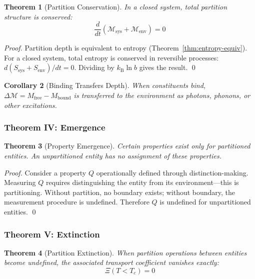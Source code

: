 \documentclass[twocolumn,10pt,a4paper]{article}
\newtheorem{theorem}{Theorem}[section]
\newtheorem{corollary}[theorem]{Corollary}
\theoremstyle{definition}
\theoremstyle{remark}
\newcommand{\kB}{k_{\mathrm{B}}}
\newcommand{\Depth}{\mathcal{M}}
\newcommand{\Mfree}{M_{\mathrm{free}}}
\newcommand{\Mbound}{M_{\mathrm{bound}}}
\begin{document}
\begin{theorem}[Partition Conservation]
\label{thm:conservation}
In a closed system, total partition structure is conserved:
\begin{equation}
    \frac{d}{dt}\left(\Depth_{\text{sys}} + \Depth_{\text{env}}\right) = 0
\end{equation}
\end{theorem}

\begin{proof}
Partition depth is equivalent to entropy (Theorem~\ref{thm:entropy-equiv}). For a closed system, total entropy is conserved in reversible processes: $d(S_{\text{sys}} + S_{\text{env}})/dt = 0$. Dividing by $\kB \ln b$ gives the result. \qed
\end{proof}

\begin{corollary}[Binding Transfers Depth]
When constituents bind, $\Delta\Depth = \Mfree - \Mbound$ is transferred to the environment as photons, phonons, or other excitations.
\end{corollary}

\subsubsection{Theorem IV: Emergence}

\begin{theorem}[Property Emergence]
\label{thm:emergence}
Certain properties exist only for partitioned entities. An unpartitioned entity has no assignment of these properties.
\end{theorem}

\begin{proof}
Consider a property $Q$ operationally defined through distinction-making. Measuring $Q$ requires distinguishing the entity from its environment---this is partitioning. Without partition, no boundary exists; without boundary, the measurement procedure is undefined. Therefore $Q$ is undefined for unpartitioned entities. \qed
\end{proof}

\subsubsection{Theorem V: Extinction}

\begin{theorem}[Partition Extinction]
\label{thm:extinction}
When partition operations between entities become undefined, the associated transport coefficient vanishes exactly:
\begin{equation}
    \Xi(T < T_c) = 0
\end{equation}
\end{theorem}
\end{document}
